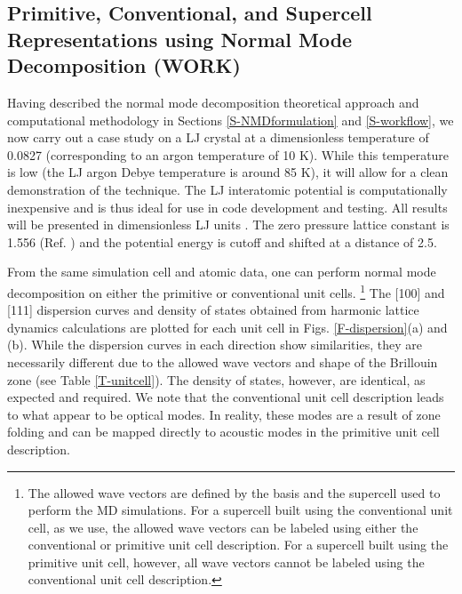 \subsection{\label{A:unitcell}Primitive, Conventional, and Supercell 
Representations using Normal Mode Decomposition (WORK)}

Having described the normal mode decomposition theoretical approach and 
computational methodology in Sections \ref{S-NMDformulation} and 
\ref{S-workflow}, we now carry out a case study on a LJ crystal at a 
dimensionless temperature of 0.0827 (corresponding to an argon 
temperature of 10 K). While this temperature is low (the LJ argon Debye 
temperature is around 85 K), it will allow for a clean demonstration of 
the technique. The LJ interatomic potential is computationally inexpensive 
and is thus ideal for use in code development and testing. All results 
will be presented in dimensionless LJ units \cite{ashcroft_solid_1976}. 
The zero pressure lattice constant is 1.556 (Ref. 
) 
and the potential energy is cutoff and shifted at a distance of 2.5.

From the same simulation cell and atomic data, one can perform normal 
mode decomposition on either the primitive or conventional unit cells.
\footnote{The allowed wave vectors are defined by the basis
and the supercell used to perform the MD simulations. For a supercell 
built using the conventional unit cell, as we use, the allowed wave 
vectors can be labeled using either the conventional or primitive unit 
cell description.  For a supercell built using the primitive unit cell, 
however, all wave vectors cannot be labeled using the conventional unit 
cell description.} The [100] and [111] dispersion curves and density of 
states obtained from harmonic lattice dynamics calculations are plotted 
for each unit cell in Figs. \ref{F-dispersion}(a) and (b). While the 
dispersion curves in each direction show similarities, they are 
necessarily different due to the allowed wave vectors and shape of the 
Brillouin zone (see Table \ref{T-unitcell}). The density of states, 
however, are identical, as expected and required. We note that the 
conventional unit cell description leads to what appear to be optical 
modes. In reality, these modes are a result of zone folding and can be 
mapped directly to acoustic modes in the primitive unit cell description.


